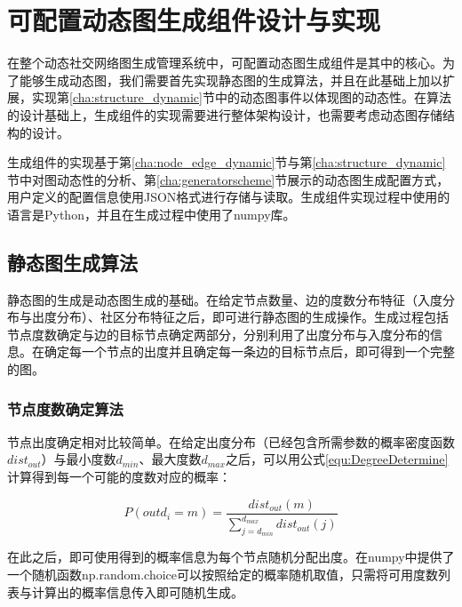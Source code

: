 
\chapter{可配置动态图生成组件设计与实现}
\label{cha:chapter03}

在整个动态社交网络图生成管理系统中，可配置动态图生成组件是其中的核心。为了能够生成动态图，我们需要首先实现静态图的生成算法，并且在此基础上加以扩展，实现第\ref{cha:structure_dynamic}节中的动态图事件以体现图的动态性。在算法的设计基础上，生成组件的实现需要进行整体架构设计，也需要考虑动态图存储结构的设计。

生成组件的实现基于第\ref{cha:node_edge_dynamic}节与第\ref{cha:structure_dynamic}节中对图动态性的分析、第\ref{cha:generatorscheme}节展示的动态图生成配置方式，用户定义的配置信息使用JSON格式进行存储与读取。生成组件实现过程中使用的语言是Python，并且在生成过程中使用了numpy库。

\section{静态图生成算法}
\label{cha:staticgraph}

静态图的生成是动态图生成的基础。在给定节点数量、边的度数分布特征（入度分布与出度分布）、社区分布特征之后，即可进行静态图的生成操作。生成过程包括节点度数确定与边的目标节点确定\cite{FastSGG}两部分，分别利用了出度分布与入度分布的信息。在确定每一个节点的出度并且确定每一条边的目标节点后，即可得到一个完整的图。

\subsection{节点度数确定算法}

节点出度确定相对比较简单。在给定出度分布（已经包含所需参数的概率密度函数$dist_{out}$）与最小度数$d_{min}$、最大度数$d_{max}$之后，可以用公式\ref{equ:DegreeDetermine}计算得到每一个可能的度数对应的概率：

\vspace{-8mm}

\begin{equation}
  \label{equ:DegreeDetermine}
  P\left(outd_i=m\right)=\frac{dist_{out}(m)}{\sum\limits_{j=d_{min}}^{d_{max}}dist_{out}(j)}
\end{equation}

在此之后，即可使用得到的概率信息为每个节点随机分配出度。在numpy中提供了一个随机函数np.random.choice可以按照给定的概率随机取值，只需将可用度数列表与计算出的概率信息传入即可随机生成。

